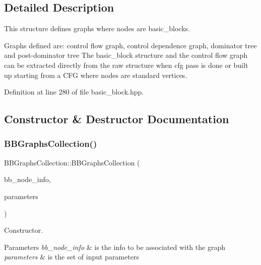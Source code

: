 \subsection{Detailed Description}
This structure defines graphs where nodes are basic\+\_\+blocks. 

Graphs defined are\+: control flow graph, control dependence graph, dominator tree and post-\/dominator tree The basic\+\_\+block structure and the control flow graph can be extracted directly from the raw structure when cfg pass is done or built up starting from a C\+FG where nodes are standard vertices. 

Definition at line 280 of file basic\+\_\+block.\+hpp.



\subsection{Constructor \& Destructor Documentation}
\mbox{\label{classBBGraphsCollection_af667f3f37b38a6c1e24c510c4b867635}} 
\subsubsection{\texorpdfstring{B\+B\+Graphs\+Collection()}{BBGraphsCollection()}}
{\footnotesize\ttfamily B\+B\+Graphs\+Collection\+::\+B\+B\+Graphs\+Collection (\begin{DoxyParamCaption}\item[{const \hyperlink{basic__block_8hpp_a7fedb7a9906aec21ae08b9f603e42b6d}{B\+B\+Graph\+Info\+Ref}}]{bb\+\_\+node\+\_\+info,  }\item[{const \hyperlink{Parameter_8hpp_a37841774a6fcb479b597fdf8955eb4ea}{Parameter\+Const\+Ref}}]{parameters }\end{DoxyParamCaption})}



Constructor. 


\begin{DoxyParams}{Parameters}
{\em bb\+\_\+node\+\_\+info} & is the info to be associated with the graph \\
\hline
{\em parameters} & is the set of input parameters \\
\hline
\end{DoxyParams}


